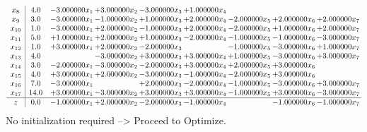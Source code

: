 \documentclass[10pt]{article}
\begin{document}
\[\begin{array}{c| c c@{\hskip 2pt} c@{\hskip 2pt} c@{\hskip 2pt} c@{\hskip 2pt} c@{\hskip 2pt} c@{\hskip 2pt} c@{\hskip 2pt} }
 x_{8}   &  4.0 & -3.000000 x_{1} & + 3.000000 x_{2} & -3.000000 x_{3} & + 1.000000 x_{4} &    &    &   \\
 x_{9}   &  3.0 & -3.000000 x_{1} & -1.000000 x_{2} & + 1.000000 x_{3} & + 2.000000 x_{4} & -2.000000 x_{5} & + 2.000000 x_{6} & + 2.000000 x_{7}\\
 x_{10}   &  1.0 & -3.000000 x_{1} & + 2.000000 x_{2} & -1.000000 x_{3} & + 2.000000 x_{4} & -2.000000 x_{5} & + 1.000000 x_{6} & + 2.000000 x_{7}\\
 x_{11}   &  5.0 & + 1.000000 x_{1} & + 2.000000 x_{2} & + 1.000000 x_{3} & -2.000000 x_{4} & -1.000000 x_{5} & -1.000000 x_{6} & -3.000000 x_{7}\\
 x_{12}   &  1.0 & + 3.000000 x_{1} & + 2.000000 x_{2} & -2.000000 x_{3} &   & -1.000000 x_{5} & -3.000000 x_{6} & + 1.000000 x_{7}\\
 x_{13}   &  4.0  &   & -3.000000 x_{2} & + 3.000000 x_{3} & + 3.000000 x_{4} & + 1.000000 x_{5} & -3.000000 x_{6} & + 3.000000 x_{7}\\
 x_{14}   &  3.0 & -2.000000 x_{1} & -3.000000 x_{2} & -2.000000 x_{3} & + 3.000000 x_{4} & + 2.000000 x_{5} & + 3.000000 x_{6} &   \\
 x_{15}   &  4.0 & + 3.000000 x_{1} & + 2.000000 x_{2} & -3.000000 x_{3} & -1.000000 x_{4} & -2.000000 x_{5} & + 3.000000 x_{6} &   \\
 x_{16}   &  7.0 & -3.000000 x_{1} &   & + 2.000000 x_{3} & -2.000000 x_{4} & -1.000000 x_{5} & -3.000000 x_{6} & + 3.000000 x_{7}\\
 x_{17}   &  14.0 & + 3.000000 x_{1} & -3.000000 x_{2} & + 3.000000 x_{3} & + 3.000000 x_{4} & -1.000000 x_{5} & + 3.000000 x_{6} & -3.000000 x_{7}\\
\hline
z    &  0.0 & -1.000000 x_{1} & + 2.000000 x_{2} & -2.000000 x_{3} & -1.000000 x_{4} &   & -1.000000 x_{6} & -1.000000 x_{7}\\
\end{array}\]
No initialization required --> Proceed to Optimize. 
\end{document}
